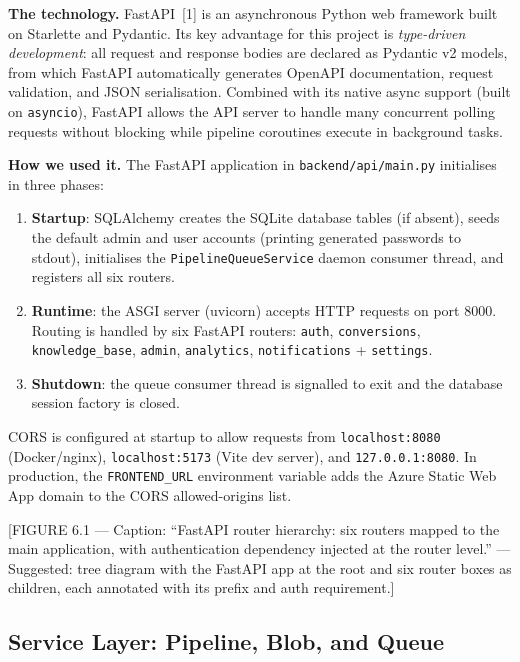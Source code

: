 \textbf{The technology.} FastAPI~[1] is an asynchronous Python web framework
built on Starlette and Pydantic. Its key advantage for this project is
\emph{type-driven development}: all request and response bodies are declared as
Pydantic v2 models, from which FastAPI automatically generates OpenAPI
documentation, request validation, and JSON serialisation. Combined with its
native async support (built on \texttt{asyncio}), FastAPI allows the API server
to handle many concurrent polling requests without blocking while pipeline
coroutines execute in background tasks.

\textbf{How we used it.} The FastAPI application in
\texttt{backend/api/main.py} initialises in three phases:

\begin{enumerate}
  \item \textbf{Startup}: SQLAlchemy creates the SQLite database tables (if
    absent), seeds the default admin and user accounts (printing generated
    passwords to stdout), initialises the \texttt{PipelineQueueService} daemon
    consumer thread, and registers all six routers.
  \item \textbf{Runtime}: the ASGI server (uvicorn) accepts HTTP requests on
    port 8000. Routing is handled by six FastAPI routers: \texttt{auth},
    \texttt{conversions}, \texttt{knowledge\_base}, \texttt{admin},
    \texttt{analytics}, \texttt{notifications} + \texttt{settings}.
  \item \textbf{Shutdown}: the queue consumer thread is signalled to exit
    and the database session factory is closed.
\end{enumerate}

CORS is configured at startup to allow requests from
\texttt{localhost:8080} (Docker/nginx), \texttt{localhost:5173} (Vite dev server),
and \texttt{127.0.0.1:8080}. In production, the \texttt{FRONTEND\_URL}
environment variable adds the Azure Static Web App domain to the CORS
allowed-origins list.

[FIGURE 6.1 --- Caption: ``FastAPI router hierarchy: six routers mapped to
the main application, with authentication dependency injected at the router
level.'' --- Suggested: tree diagram with the FastAPI app at the root and six
router boxes as children, each annotated with its prefix and auth requirement.]

\subsection{Service Layer: Pipeline, Blob, and Queue}
\label{subsec:service-layer}

